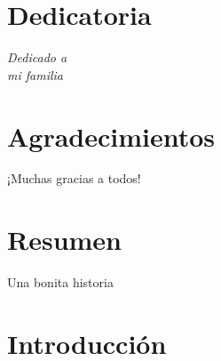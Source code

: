 \documentclass[12pt,a4paper]{book}
\begin{document}
\chapter*{Dedicatoria}

%
\begin{flushright}
\textit{Dedicado a \\
mi familia}
\end{flushright}

%
\chapter*{Agradecimientos} %
 
¡Muchas gracias a todos!

\chapter*{Resumen} %

%
Una bonita historia
%
%
%
\chapter{Introducción}

\end{document}

